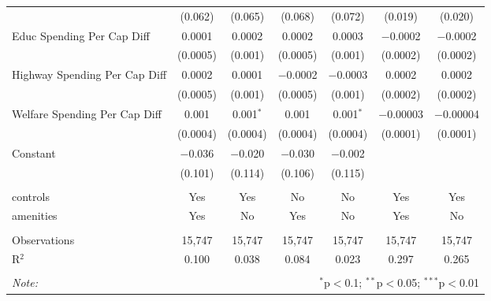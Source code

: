 \begin{table}[!htbp]
\begin{tabular}{@{\extracolsep{5pt}}lcccccc}
  & (0.062) & (0.065) & (0.068) & (0.072) & (0.019) & (0.020) \\ 
  Educ Spending Per Cap Diff & 0.0001 & 0.0002 & 0.0002 & 0.0003 & $-$0.0002 & $-$0.0002 \\ 
  & (0.0005) & (0.001) & (0.0005) & (0.001) & (0.0002) & (0.0002) \\ 
  Highway Spending Per Cap Diff & 0.0002 & 0.0001 & $-$0.0002 & $-$0.0003 & 0.0002 & 0.0002 \\ 
  & (0.0005) & (0.001) & (0.0005) & (0.001) & (0.0002) & (0.0002) \\ 
  Welfare Spending Per Cap Diff & 0.001 & 0.001$^{*}$ & 0.001 & 0.001$^{*}$ & $-$0.00003 & $-$0.00004 \\ 
  & (0.0004) & (0.0004) & (0.0004) & (0.0004) & (0.0001) & (0.0001) \\ 
  Constant & $-$0.036 & $-$0.020 & $-$0.030 & $-$0.002 &  &  \\ 
  & (0.101) & (0.114) & (0.106) & (0.115) &  &  \\ 
 \hline \\[-1.8ex] 
controls & Yes & Yes & No & No & Yes & Yes \\ 
amenities & Yes & No & Yes & No & Yes & No \\ 
\hline \\[-1.8ex] 
Observations & 15,747 & 15,747 & 15,747 & 15,747 & 15,747 & 15,747 \\ 
R$^{2}$ & 0.100 & 0.038 & 0.084 & 0.023 & 0.297 & 0.265 \\ 
\hline 
\hline \\[-1.8ex] 
\textit{Note:}  & \multicolumn{6}{r}{$^{*}$p$<$0.1; $^{**}$p$<$0.05; $^{***}$p$<$0.01} \\ 
\end{tabular} 
\end{table} 
